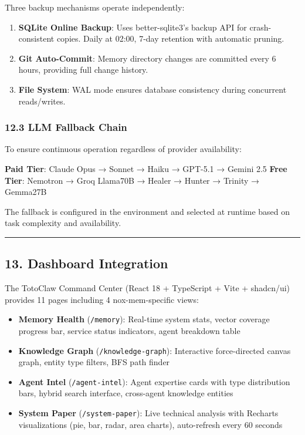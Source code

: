 \documentclass[
]{article}
\providecommand{\tightlist}{%
  \setlength{\itemsep}{0pt}\setlength{\parskip}{0pt}}
\begin{document}
Three backup mechanisms operate independently:

\begin{enumerate}
\def\labelenumi{\arabic{enumi}.}
\tightlist
\item
  \textbf{SQLite Online Backup}: Uses better-sqlite3's backup API for
  crash-consistent copies. Daily at 02:00, 7-day retention with
  automatic pruning.
\item
  \textbf{Git Auto-Commit}: Memory directory changes are committed every
  6 hours, providing full change history.
\item
  \textbf{File System}: WAL mode ensures database consistency during
  concurrent reads/writes.
\end{enumerate}

\subsubsection{12.3 LLM Fallback Chain}\label{llm-fallback-chain}

To ensure continuous operation regardless of provider availability:

\textbf{Paid Tier}: Claude Opus → Sonnet → Haiku → GPT-5.1 → Gemini 2.5
\textbf{Free Tier}: Nemotron → Groq Llama70B → Healer → Hunter → Trinity
→ Gemma27B

The fallback is configured in the environment and selected at runtime
based on task complexity and availability.

\begin{center}\rule{0.5\linewidth}{0.5pt}\end{center}

\subsection{13. Dashboard Integration}\label{dashboard-integration}

The TotoClaw Command Center (React 18 + TypeScript + Vite + shadcn/ui)
provides 11 pages including 4 nox-mem-specific views:

\begin{itemize}
\tightlist
\item
  \textbf{Memory Health} (\texttt{/memory}): Real-time system stats,
  vector coverage progress bar, service status indicators, agent
  breakdown table
\item
  \textbf{Knowledge Graph} (\texttt{/knowledge-graph}): Interactive
  force-directed canvas graph, entity type filters, BFS path finder
\item
  \textbf{Agent Intel} (\texttt{/agent-intel}): Agent expertise cards
  with type distribution bars, hybrid search interface, cross-agent
  knowledge entities
\item
  \textbf{System Paper} (\texttt{/system-paper}): Live technical
  analysis with Recharts visualizations (pie, bar, radar, area charts),
  auto-refresh every 60 seconds
\end{itemize}
\end{document}

